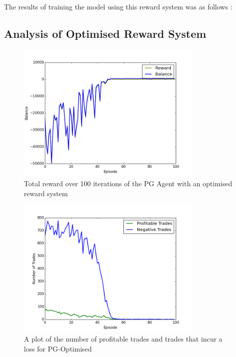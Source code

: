 \documentclass[ %
                    author={Ashwinder Khurana},
                supervisor={Prof Dave Cliff},
                    degree={MEng},
                     title={The Deeply Reinforced Trader},
                  subtitle={},
                      type={enterprise},
                      year={2020} ]{dissertation}
\begin{document}
{\\
\\
The results of training the model using this reward system was as follows {\color{red}{get data for this}}: 

\subsection{Analysis of Optimised Reward System}
\label{subsection:Analysis and Evaluation of PG Vanilla}
\begin{figure}[H]
	\centering
  	\includegraphics[width=0.8\textwidth]{PG-Vanilla-Reward.png}
  	\caption{Total reward over 100 iterations of the PG Agent with an optimised reward system }
	\label{fig:PG-Optimised-Balance}  
\end{figure}




\begin{figure}[H] 
	\centering
  	\includegraphics[width=0.8\textwidth]{PG-Vanilla-Good-Vs-Bad-Trades.png}
  	\caption{A plot of the number of profitable trades and trades that incur a loss for PG-Optimised }
	\label{fig:PG-Optimised-Good-Vs-Bad}  
\end{figure}

}
\end{document}
